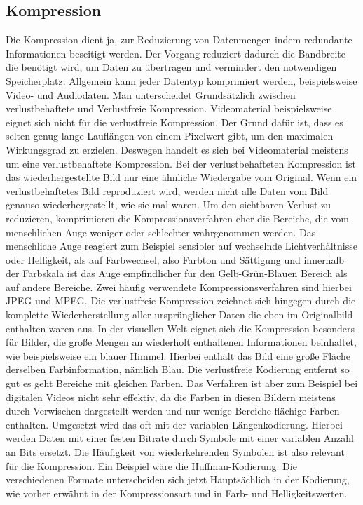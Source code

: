 \documentclass[11pt, a4paper, twocolumn]{article}
\begin{document}
	\subsection{Kompression}
	Die Kompression dient ja, zur Reduzierung von Datenmengen indem redundante Informationen beseitigt werden. Der Vorgang reduziert dadurch die Bandbreite die benötigt wird, um Daten zu übertragen und vermindert den notwendigen Speicherplatz. Allgemein kann jeder Datentyp komprimiert werden, beispielsweise Video- und Audiodaten. Man unterscheidet Grundsätzlich zwischen verlustbehaftete und Verlustfreie Kompression.
	Videomaterial beispielsweise eignet sich nicht für die verlustfreie Kompression. Der Grund dafür ist, dass es selten genug lange Lauflängen von  einem Pixelwert gibt, um den maximalen Wirkungsgrad zu erzielen. Deswegen handelt es sich bei Videomaterial meistens um eine verlustbehaftete Kompression. Bei der verlustbehafteten Kompression ist das wiederhergestellte Bild nur eine ähnliche Wiedergabe vom Original. Wenn ein verlustbehaftetes Bild reproduziert wird, werden nicht alle Daten vom Bild genauso wiederhergestellt, wie sie mal waren. Um den sichtbaren Verlust zu reduzieren, komprimieren die Kompressionsverfahren eher die Bereiche, die vom menschlichen Auge weniger oder schlechter wahrgenommen werden. Das menschliche Auge reagiert zum Beispiel sensibler auf wechselnde Lichtverhältnisse oder Helligkeit, als auf Farbwechsel, also Farbton und Sättigung und innerhalb der Farbskala ist das Auge empfindlicher für den Gelb-Grün-Blauen Bereich als auf andere Bereiche. Zwei häufig verwendete Kompressionsverfahren sind hierbei JPEG und MPEG.
	Die verlustfreie Kompression zeichnet sich hingegen durch die komplette Wiederherstellung aller ursprünglicher Daten die eben im Originalbild enthalten waren aus. In der visuellen Welt eignet sich die Kompression besonders für Bilder, die große Mengen an wiederholt enthaltenen Informationen beinhaltet, wie beispielsweise ein blauer Himmel. Hierbei enthält das Bild eine große Fläche derselben Farbinformation, nämlich Blau. Die verlustfreie Kodierung entfernt so gut es geht Bereiche mit gleichen Farben. Das Verfahren ist aber zum Beispiel bei digitalen Videos nicht sehr effektiv, da die Farben in diesen Bildern meistens durch Verwischen dargestellt werden und nur wenige Bereiche flächige Farben enthalten.
	Umgesetzt wird das oft mit der variablen Längenkodierung. Hierbei werden Daten mit einer festen Bitrate durch Symbole mit einer variablen Anzahl an Bits ersetzt. Die Häufigkeit von wiederkehrenden Symbolen ist also relevant für die Kompression. Ein Beispiel wäre die Huffman-Kodierung.
	Die verschiedenen Formate unterscheiden sich jetzt Hauptsächlich in der Kodierung, wie vorher erwähnt in der Kompressionsart und in Farb- und Helligkeitswerten.
\end{document}
